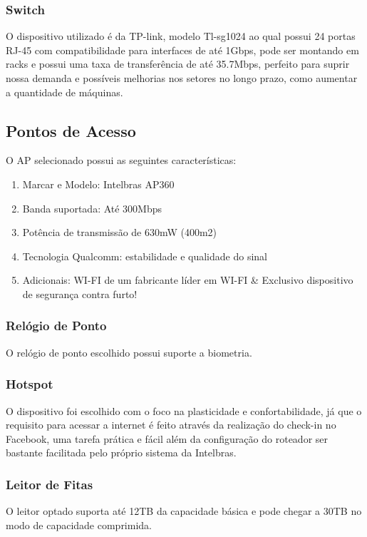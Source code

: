 \documentclass[12pt]{article}
\begin{document}
\subsubsection{Switch}
O dispositivo utilizado é da TP-link, modelo Tl-sg1024 ao qual possui 24 portas RJ-45 com compatibilidade para interfaces de até 1Gbps, pode ser montando em racks e possui uma taxa de transferência de até 35.7Mbps, perfeito para suprir nossa demanda e possíveis melhorias nos setores no longo prazo, como aumentar a quantidade de máquinas.

\subsection{Pontos de Acesso}
O AP selecionado possui as seguintes características:

\begin{enumerate}
    \item Marcar e Modelo: Intelbras AP360
    \item Banda suportada: Até 300Mbps
    \item Potência de transmissão de 630mW (400m2)
    \item Tecnologia Qualcomm: estabilidade e qualidade do sinal
    \item Adicionais: WI-FI de um fabricante líder em WI-FI \& Exclusivo dispositivo de segurança contra furto!
\end{enumerate}

\subsubsection{Relógio de Ponto}
O relógio de ponto escolhido possui suporte a biometria.

\subsubsection{Hotspot}
O dispositivo foi escolhido com o foco na plasticidade e confortabilidade, já que o requisito para acessar a internet é feito através da realização do check-in no Facebook, uma tarefa prática e fácil além da configuração do roteador ser bastante facilitada pelo próprio sistema da Intelbras.

\subsubsection{Leitor de Fitas}
O leitor optado suporta até 12TB da capacidade básica e pode chegar a 30TB no modo de capacidade comprimida.
\end{document}
